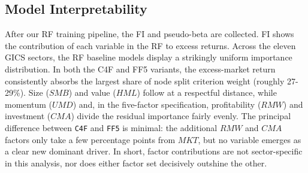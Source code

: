 


\subsection{Model Interpretability}

After our RF training pipeline, the FI and pseudo-beta are collected. FI shows the contribution of each variable in the RF to excess returns. Across the eleven GICS sectors, the RF baseline models display a strikingly uniform importance distribution. In both the C4F and FF5 variants, the excess-market return consistently absorbs the largest share of node split criterion weight (roughly 27-29\%). Size ($SMB$) and value ($HML$) follow at a respectful distance, while momentum ($UMD$) and, in the five-factor specification, profitability ($RMW$) and investment ($CMA$) divide the residual importance fairly evenly. The principal difference between \texttt{C4F} and \texttt{FF5} is minimal: the additional $RMW$ and $CMA$ factors only take a few percentage points from $MKT$, but no variable emerges as a clear new dominant driver. In short, factor contributions are not sector-specific in this analysis, nor does either factor set decisively outshine the other.

